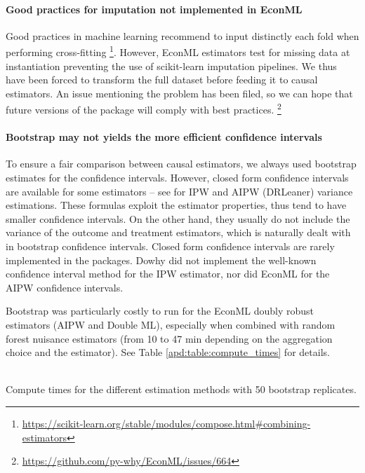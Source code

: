 \documentclass[french,12pt,twoside,a4paper]{book}
\begin{document}
\begin{appendices}
  \paragraph{Good practices for imputation not implemented in EconML}

  Good practices in machine learning recommend to input distinctly each fold
  when performing cross-fitting
  \footnote{\url{https://scikit-learn.org/stable/modules/compose.html\#combining-estimators}}.
  However, EconML estimators test for missing data at instantiation
  preventing the use of scikit-learn imputation pipelines. We thus have been
  forced to transform the full dataset before feeding it to causal estimators.
  An issue mentioning the problem has been filed, so we can hope that future
  versions of the package will comply with best practices. \footnote{\url{https://github.com/py-why/EconML/issues/664}}

  \paragraph{Bootstrap may not yields the more efficient confidence intervals}

  To ensure a fair comparison between causal estimators, we always used
  bootstrap estimates for the confidence intervals. However, closed form
  confidence intervals are available for some estimators -- see \cite{wager2020stats}
  for IPW and AIPW (DRLeaner) variance estimations. These formulas exploit the
  estimator properties, thus tend to have smaller confidence intervals. On the
  other hand, they usually do not include the variance of the outcome and
  treatment estimators, which is naturally dealt with in bootstrap confidence
  intervals. Closed form confidence intervals are rarely implemented in the
  packages. Dowhy did not implement the well-known confidence interval method for
  the IPW estimator, nor did EconML for the AIPW confidence intervals.

  Bootstrap was particularly costly to run for the EconML doubly robust
  estimators (AIPW and Double ML), especially when combined with random forest nuisance
  estimators (from 10 to 47 min depending on the aggregation choice and the
  estimator). See Table \ref{apd:table:compute_times} for details.

  \begin{table}[]
    \centering\small
    
    \\
    \caption{Compute times for the different estimation methods with 50 bootstrap replicates.}\label{apd:table:compute_times}
  \end{table}


\end{appendices}
\end{document}

